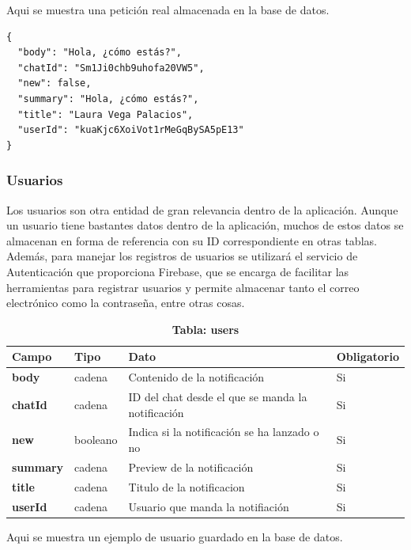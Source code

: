 \documentclass[a4paper, 12pt]{article}
\begin{document}
Aqui se muestra una petición real almacenada en la base de datos.

\begin{verbatim}
{
  "body": "Hola, ¿cómo estás?",
  "chatId": "Sm1Ji0chb9uhofa20VW5",
  "new": false,
  "summary": "Hola, ¿cómo estás?",
  "title": "Laura Vega Palacios",
  "userId": "kuaKjc6XoiVot1rMeGqBySA5pE13"
}
\end{verbatim}

\subsubsection{Usuarios}

Los usuarios son otra entidad de gran relevancia dentro de la aplicación. Aunque un usuario tiene bastantes datos dentro de la aplicación, muchos de estos datos se almacenan en forma de referencia con su ID correspondiente en otras tablas. Además, para manejar los registros de usuarios se utilizará el servicio de Autenticación que proporciona Firebase, que se encarga de facilitar las herramientas para registrar usuarios y permite almacenar tanto el correo electrónico como la contraseña, entre otras cosas.

\begin{table}[H]
\captionsetup{justification=raggedright,singlelinecheck=false}
\caption{\textbf{Tabla: users}}
\label{tab:users}
	\begin{tabular}{|m{3.2cm}|m{2cm}|m{5cm}|m{3cm}|}
	\hline
	\textbf{Campo} & \textbf{Tipo} & \textbf{Dato} & \textbf{Obligatorio} \\ 
	\hline
	\textbf{body} & cadena & Contenido de la notificación & Si \\ 
	\hline
	\textbf{chatId} & cadena &  ID del chat desde el que se manda la notificación & Si \\ 
	\hline
	\textbf{new} & booleano & Indica si la notificación se ha lanzado o no & Si \\ 
	\hline
	\textbf{summary} & cadena & Preview de la notificación & Si \\ 
	\hline
	\textbf{title} & cadena & Titulo de la notificacion & Si \\ 
	\hline
	\textbf{userId} & cadena & Usuario que manda la notifiación & Si \\ 
	\hline
	\end{tabular}
\end{table}

Aqui se muestra un ejemplo de usuario guardado en la base de datos.
\end{document}
